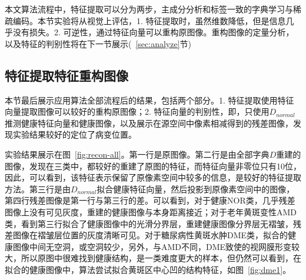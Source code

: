     本文算法流程中，特征提取可以分为两步，主成分分析和标签一致的字典学习与稀疏编码。本节实验将从视觉上评估，1. 特征提取时，虽然维数降低，但是信息几乎没有损失。2. 可逆性，通过特征向量可以重构原图像。重构图像的定量分析，以及特征的判别性将在下一节展示(~\ref{sec:analyze}节)



    \subsection{特征提取特征重构图像}
    本节最后展示应用算法全部流程后的结果，包括两个部分。1. 特征提取使用特征向量提取图像可以较好的重构原图像；2. 特征向量的判别性，即，只使用$D_{normal}$推测健康特征向量和健康图像，以及展示在源空间中像素相减得到的残差图像，发现实验结果较好的定位了病变位置。

    实验结果展示在图~\ref{fig:recon-all}。第一行是原图像。第二行是由全部字典$D$重建的图像，发现在三类中，都较好的重建了原图的特征，而特征向量非零位只有10位，因此，可以看到，该特征表示保留了原像素空间中较多的信息，是较好的特征提取方法。第三行是由$D_{normal}$拟合健康特征向量，然后投影到原像素空间中的图像，第四行残差图像是第一行与第三行的差。可以看到，对于健康NOR类，几乎残差图像上没有可见灰度，重建的健康图像与本身距离接近；对于老年黄斑变性AMD类，看到第三行拟合了健康图像中的光滑分界层，重建健康图像分界层无褶皱，残差图像在褶皱层位置的灰度清晰可见。对于糖尿病性黄斑水肿DME类，拟合的健康图像中间无空洞，或空洞较少，另外，与AMD不同，DME致使的视网膜形变较大，所以原图中很难找到健康结构，是一类难度更大的样本，但仍然可以看到，在拟合的健康图像中，算法尝试拟合黄斑区中心凹的结构特征，如图~\ref{fig:dme1}。

